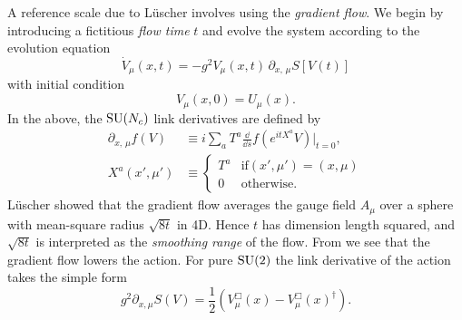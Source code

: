 A reference scale due to L\"uscher 
\cite{luscher_properties_2010} involves using 
the {\it gradient flow}. We begin by introducing a
fictitious {\it flow time} $t$ and evolve the system
according to the evolution equation
\begin{equation}\label{eq:Wflow}
  \dot{V}_\mu(x,t)=-g^2V_\mu(x,t)\,\partial_{x,\,\mu}S[V(t)]
\end{equation} 
with initial condition
\begin{equation}
  V_\mu(x,0)=U_\mu(x).
\end{equation}
In the above, the $\operatorname{SU}(N_c)$ link derivatives are defined by
\begin{equation}\begin{aligned}
  \partial_{x,\,\mu}f(V)&\equiv
     i\sum_aT^a\frac{\dd}{\dd s}f\left(e^{itX^a}V\right)\Big|_{t=0},\\
    X^a(x',\mu')&\equiv
    \begin{cases}
       T^a & \text{if} (x',\mu')=(x,\mu)\\
       0   & \text{otherwise.}
    \end{cases}
\end{aligned}\end{equation}
L\"uscher showed that the gradient flow averages the gauge field
$A_\mu$ over a sphere with mean-square radius $\sqrt{8t}$ in 4D. Hence
$t$ has dimension length squared, and $\sqrt{8t}$ is interpreted
as the {\it smoothing range} of the flow.
From  we see that the gradient flow lowers the action. 
For pure $\operatorname{SU}(2)$ the link derivative of the action takes the simple form
\begin{equation}\label{eq:SU2gflow}
  g^2\partial_{x,\mu}S(V)=\frac{1}{2}
          \left(V_\mu^\Box(x)-V_\mu^\Box(x)^\dagger\right).
\end{equation}

